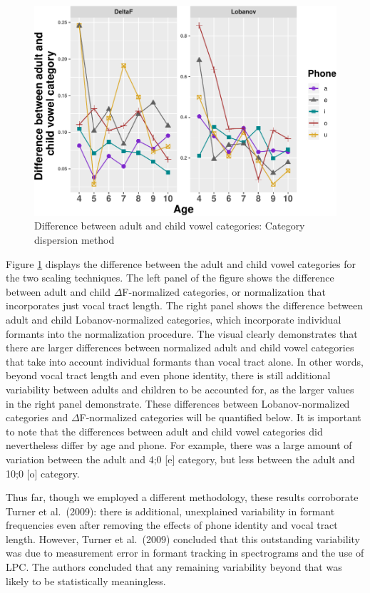\documentclass[
]{article}
\begin{document}
\begin{figure}
\centering
\includegraphics{3_vtl_results_files/figure-latex/rms-dif-figure-1.pdf}
\caption{\label{fig:rms-dif-figure}Difference between adult and child vowel categories: Category dispersion method}
\end{figure}

Figure \ref{fig:rms-dif-figure} displays the difference between the adult and child vowel categories for the two scaling techniques. The left panel of the figure shows the difference between adult and child \(\Delta\)F-normalized categories, or normalization that incorporates just vocal tract length. The right panel shows the difference between adult and child Lobanov-normalized categories, which incorporate individual formants into the normalization procedure. The visual clearly demonstrates that there are larger differences between normalized adult and child vowel categories that take into account individual formants than vocal tract alone. In other words, beyond vocal tract length and even phone identity, there is still additional variability between adults and children to be accounted for, as the larger values in the right panel demonstrate. These differences between Lobanov-normalized categories and \(\Delta\)F-normalized categories will be quantified below. It is important to note that the differences between adult and child vowel categories did nevertheless differ by age and phone. For example, there was a large amount of variation between the adult and 4;0 {[}e{]} category, but less between the adult and 10;0 {[}o{]} category.

Thus far, though we employed a different methodology, these results corroborate Turner et al.~(2009): there is additional, unexplained variability in formant frequencies even after removing the effects of phone identity and vocal tract length. However, Turner et al.~(2009) concluded that this outstanding variability was due to measurement error in formant tracking in spectrograms and the use of LPC. The authors concluded that any remaining variability beyond that was likely to be statistically meaningless.
\end{document}

